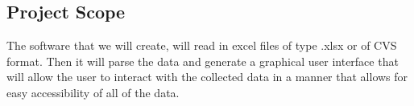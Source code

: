 \subsection{Project Scope}

The software that we will create, will read in excel files of type .xlsx or of CVS format. Then it will parse the data and generate a graphical user interface that will allow the user to interact with the collected data in a manner that allows for easy accessibility of all of the data.

